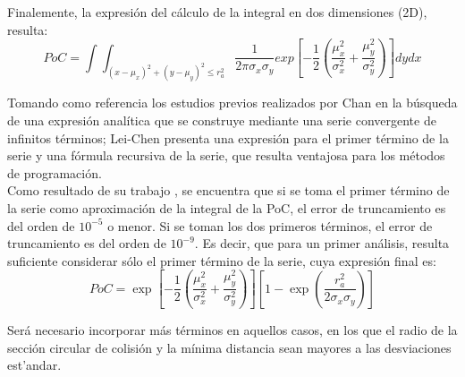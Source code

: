 {Finalemente, la expresi\'on del c\'alculo de la integral en dos dimensiones (2D), resulta:\\

\begin{equation}
 PoC=\int \int_{(x-\mu_{x})^{2}+(y-\mu_{y})^{2}\leq r_{a}^{2}} \frac{1}{2\pi\sigma_{x}\sigma_{y}} exp [-\frac{1}{2}(\frac{\mu_{x}^{2}}{\sigma_{x}^{2}}+\frac{\mu_{y}^{2}}{\sigma_{y}^{2}}) ] dy dx
 \label{eq:pocintegral}
\end{equation}

Tomando como referencia los estudios previos realizados por Chan \citep{chan2003improved} en la b\'usqueda de una expresi\'on anal\'itica que se construye mediante una serie convergente de infinitos t\'erminos; Lei-Chen presenta una expresi\'on para el primer t\'ermino de la serie y una f\'ormula recursiva de la serie, que resulta ventajosa para los m\'etodos de programaci\'on.\\

Como resultado de su trabajo \citep{lei2009rapid}, se encuentra que si se toma el primer t\'ermino de la serie como aproximaci\'on de la integral de la PoC,  el error de truncamiento es del orden de $10^{-5}$ o menor. Si se toman los dos primeros t\'erminos, el error de truncamiento es del orden de $10^{-9}$. Es decir, que para un primer an\'alisis, resulta suficiente considerar s\'olo el primer t\'ermino de la serie, cuya expresi\'on final es:\\


\begin{equation}
 PoC= \exp[-\frac{1}{2}(\frac{\mu_{x}^{2}}{\sigma_{x}^{2}}+\frac{\mu_{y}^{2}}{\sigma_{y}^{2}})][1-\exp(\frac{r_{a}^{2}}{2\sigma_{x}\sigma_{y}})]
 \label{eq:pocexpress}
\end{equation}

Ser\'a necesario incorporar m\'as t\'erminos en aquellos casos, en los que el radio de la secci\'on circular de colisi\'on y la m\'inima distancia sean mayores a las desviaciones est'andar.


}
